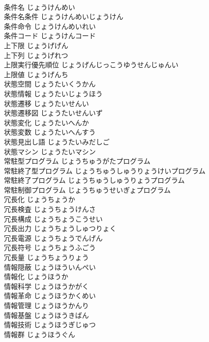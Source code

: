 \documentclass[8pt]{extreport}
\begin{document}
\begin{CJK}{UTF8}{min}
\\	条件名	じょうけんめい	
\\	条件名条件	じょうけんめいじょうけん	
\\	条件命令	じょうけんめいれい	
\\	条件コード	じょうけんコード	
\\	上下限	じょうげげん	
\\	上下列	じょうげれつ	
\\	上限実行優先順位	じょうげんじっこうゆうせんじゅんい	
\\	上限値	じょうげんち	
\\	状態空間	じょうたいくうかん	
\\	状態情報	じょうたいじょうほう	
\\	状態遷移	じょうたいせんい	
\\	状態遷移図	じょうたいせんいず	
\\	状態変化	じょうたいへんか	
\\	状態変数	じょうたいへんすう	
\\	状態見出し語	じょうたいみだしご	
\\	状態マシン	じょうたいマシン	
\\	常駐型プログラム	じょうちゅうがたプログラム	
\\	常駐終了型プログラム	じょうちゅうしゅうりょうけいプログラム	
\\	常駐終了プログラム	じょうちゅうしゅうりょうプログラム	
\\	常駐制御プログラム	じょうちゅうせいぎょプログラム	
\\	冗長化	じょうちょうか	
\\	冗長検査	じょうちょうけんさ	
\\	冗長構成	じょうちょうこうせい	
\\	冗長出力	じょうちょうしゅつりょく	
\\	冗長電源	じょうちょうでんげん	
\\	冗長符号	じょうちょうふごう	
\\	冗長量	じょうちょうりょう	
\\	情報隠蔽	じょうほういんぺい	
\\	情報化	じょうほうか	
\\	情報科学	じょうほうかがく	
\\	情報革命	じょうほうかくめい	
\\	情報管理	じょうほうかんり	
\\	情報基盤	じょうほうきばん	
\\	情報技術	じょうほうぎじゅつ	
\\	情報群	じょうほうぐん	

\end{CJK}
\end{document}
